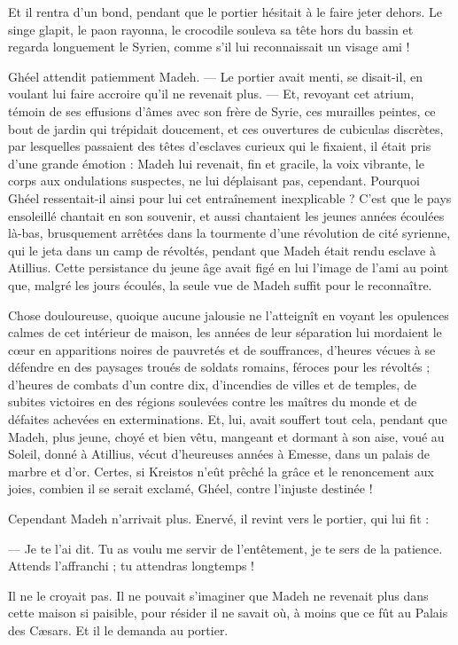 \documentclass[a4paper, 11pt, oneside, polutonikogreek, french]{article}
\begin{document}
Et il rentra d'un bond, pendant que le portier hésitait à le faire jeter dehors. Le singe glapit, le paon rayonna, le crocodile souleva sa tête hors du bassin et regarda longuement le Syrien, comme s'il lui reconnaissait un visage ami !

Ghéel attendit patiemment Madeh. --- Le portier avait menti, se disait-il, en voulant lui faire accroire qu'il ne revenait plus. --- Et, revoyant cet atrium, témoin de ses effusions d'âmes avec son frère de Syrie, ces murailles peintes, ce bout de jardin qui trépidait doucement, et ces ouvertures de cubiculas discrètes, par lesquelles passaient des têtes d'esclaves curieux qui le fixaient, il était pris d'une grande émotion : Madeh lui revenait, fin et gracile, la voix vibrante, le corps aux ondulations suspectes, ne lui déplaisant pas, cependant. Pourquoi Ghéel ressentait-il ainsi pour lui cet entraînement inexplicable ? C'est que le pays ensoleillé chantait en son souvenir, et aussi chantaient les jeunes années écoulées là-bas, brusquement arrêtées dans la tourmente d'une révolution de cité syrienne, qui le jeta dans un camp de révoltés, pendant que Madeh était rendu esclave à Atillius. Cette persistance du jeune âge avait figé en lui l'image de l'ami au point que, malgré les jours écoulés, la seule vue de Madeh suffit pour le reconnaître.

Chose douloureuse, quoique aucune jalousie ne l'atteignît en voyant les opulences calmes de cet intérieur de maison, les années de leur séparation lui mordaient le cœur en apparitions noires de pauvretés et de souffrances, d'heures vécues à se défendre en des paysages troués de soldats romains, féroces pour les révoltés ; d'heures de combats d'un contre dix, d'incendies de villes et de temples, de subites victoires en des régions soulevées contre les maîtres du monde et de défaites achevées en exterminations. Et, lui, avait souffert tout cela, pendant que Madeh, plus jeune, choyé et bien vêtu, mangeant et dormant à son aise, voué au Soleil, donné à Atillius, vécut d'heureuses années à Emesse, dans un palais de marbre et d'or. Certes, si Kreistos n'eût prêché la grâce et le renoncement aux joies, combien il se serait exclamé, Ghéel, contre l'injuste destinée !

Cependant Madeh n'arrivait plus. Enervé, il revint vers le portier, qui lui fit :

--- Je te l'ai dit. Tu as voulu me servir de l'entêtement, je te sers de la patience. Attends l'affranchi ; tu attendras longtemps !

Il ne le croyait pas. Il ne pouvait s'imaginer que Madeh ne revenait plus dans cette maison si paisible, pour résider il ne savait où, à moins que ce fût au Palais des Cæsars. Et il le demanda au portier.
\end{document}
